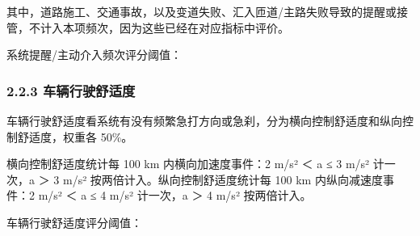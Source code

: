 其中，道路施工、交通事故，以及变道失败、汇入匝道/主路失败导致的提醒或接管，不计入本项频次，因为这些已经在对应指标中评价。

系统提醒/主动介入频次评分阈值：

\subsubsection{2.2.3 车辆行驶舒适度}

车辆行驶舒适度看系统有没有频繁急打方向或急刹，分为横向控制舒适度和纵向控制舒适度，权重各 50\%。

横向控制舒适度统计每 100 km 内横向加速度事件：2 m/s² ＜ a ≤ 3 m/s² 计一次，a ＞ 3 m/s² 按两倍计入。纵向控制舒适度统计每 100 km 内纵向减速度事件：2 m/s² ＜ a ≤ 4 m/s² 计一次，a ＞ 4 m/s² 按两倍计入。

车辆行驶舒适度评分阈值：
